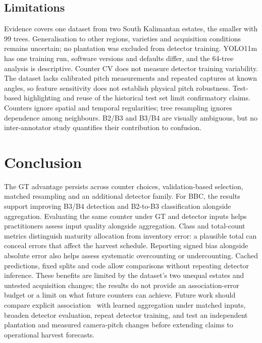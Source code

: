 \documentclass[conference,a4paper]{IEEEtran}
\begin{document}
\subsection{Limitations}
\label{sec:limits}
Evidence covers one dataset from two South Kalimantan estates, the smaller
with 99 trees. Generalisation to other regions, varieties and acquisition
conditions remains uncertain; no plantation was excluded from detector training.
YOLO11m has one training run, software versions and defaults differ, and the 64-tree analysis
is descriptive. Counter CV does not measure detector training variability.
The dataset lacks calibrated pitch measurements and repeated captures at known
angles, so feature sensitivity does not establish physical pitch robustness.
Test-based highlighting and reuse of the historical test set limit confirmatory
claims. Counters ignore spatial and temporal regularities; tree resampling
ignores dependence among neighbours. B2/B3 and B3/B4 are visually ambiguous,
but no inter-annotator study quantifies their contribution to confusion.

\section{Conclusion}
The GT advantage persists across counter choices, validation-based selection,
matched resampling and an additional detector family. For BBC, the results
support improving B3/B4 detection and B2-to-B3 classification alongside
aggregation. Evaluating the same counter under GT and detector inputs helps
practitioners assess input quality alongside aggregation. Class and total-count
metrics distinguish maturity allocation from inventory error: a plausible total
can conceal errors that affect the harvest schedule. Reporting signed bias
alongside absolute error also helps assess systematic overcounting or
undercounting. Cached predictions, fixed splits and code allow comparisons
without repeating detector inference. These benefits are limited by the dataset's
two unequal estates and untested acquisition changes; the results do not provide
an association-error budget or a limit on what future counters can achieve.
Future work should compare explicit association~\cite{ref2,ref3,ref4} with learned
aggregation under matched inputs, broaden detector evaluation, repeat detector
training, and test an independent plantation and measured camera-pitch changes
before extending claims to operational harvest forecasts.

\balance
\end{document}
